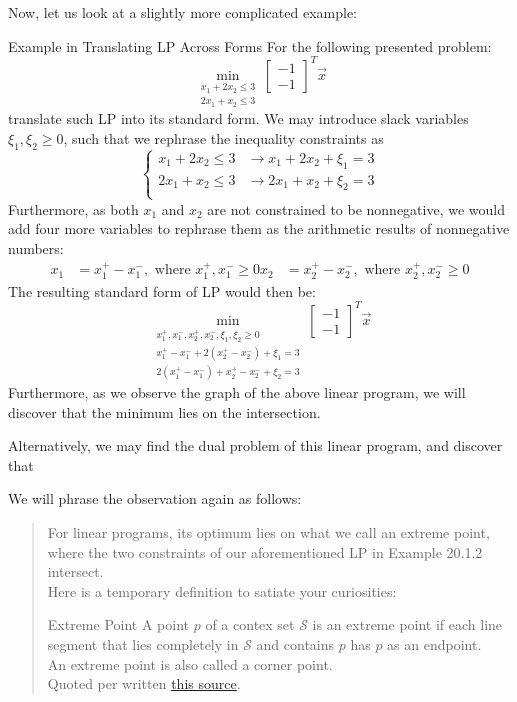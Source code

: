 Now, let us look at a slightly more complicated example:
\begin{ln-explain}{Example in Translating LP Across Forms}{}
    For the following presented problem:
    \[
        \min_{
            \substack{
                x_1 + 2x_2 \leq 3 \\
                2x_1 + x_2 \leq 3
            }
        } \begin{bmatrix} -1 \\ -1 \end{bmatrix}^T \vec{x}
    \]
    translate such LP into its standard form.
    \tcblower
    We may introduce slack variables $\xi_1, \xi_2 \geq 0$, such that we rephrase the inequality constraints as
    \[
        \begin{cases}
            x_1 + 2x_2 \leq 3 &\rightarrow x_1 + 2x_2 + \xi_1 = 3 \\
            2x_1 + x_2 \leq 3 &\rightarrow 2x_1 + x_2 + \xi_2 = 3 \\
        \end{cases}
    \]
    Furthermore, as both $x_1$ and $x_2$ are not constrained to be nonnegative, we would add four more variables to rephrase them as the arithmetic results of nonnegative numbers:
    \begin{align*}
        x_1 &= x_1^+ - x_1^-, \text{ where } x_1^+, x_1^- \geq 0
        x_2 &= x_2^+ - x_2^-, \text{ where } x_2^+, x_2^- \geq 0
    \end{align*}
    The resulting standard form of LP would then be:
    \[
        \min_{
            \substack{
                x_1^+, x_1^-, x_2^+, x_2^-, \xi_1, \xi_2 \geq 0 \\
                x_1^+ - x_1^- + 2 (x_2^+ - x_2^-) + \xi_1 = 3 \\
                2 (x_1^+ - x_1^-) + x_2^+ - x_2^- + \xi_2 = 3
            }
        } \begin{bmatrix} -1 \\ -1 \end{bmatrix}^T \vec{x}
    \]
    Furthermore, as we observe the graph of the above linear program, we will discover that the minimum lies on the intersection.
    \par
    Alternatively, we may find the dual problem of this linear program, and discover that 
\end{ln-explain}
We will phrase the observation again as follows:
\begin{quote}
    For linear programs, its optimum lies on what we call an extreme point, where the two constraints of our aforementioned LP in Example 20.1.2 intersect. \\
    Here is a temporary definition to satiate your curiosities:
    \begin{ln-define}{Extreme Point}{}
        A point $p$ of a contex set $\mathcal{S}$ is an extreme point if each line segment that lies completely in $\mathcal{S}$ and contains $p$ has $p$ as an endpoint. \\
        An extreme point is also called a corner point. \\
        Quoted per written \href{http://www.columbia.edu/~cs2035/courses/csor4231.F09/lpdef.pdf}{this source}.
    \end{ln-define}
\end{quote}
